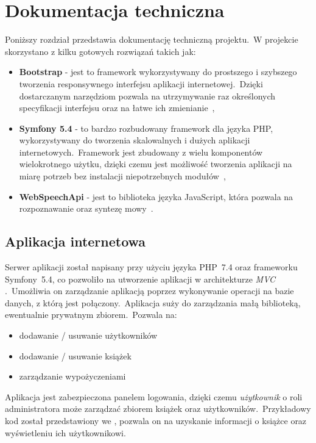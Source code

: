 \chapter{Dokumentacja techniczna}
Poniższy rozdział przedstawia dokumentację techniczną projektu.\ W projekcie skorzystano z kilku gotowych rozwiązań takich jak:
\begin{itemize}
    \item \textbf{Bootstrap} - jest to framework wykorzystywany do prostszego i szybszego tworzenia responsywnego interfejsu aplikacji internetowej.\ Dzięki dostarczanym narzędziom pozwala na utrzymywanie raz określonych specyfikacji interfejsu oraz na łatwe ich zmienianie~\cite{Bootstrap2023},
    \item \textbf{Symfony 5.4} - to bardzo rozbudowany framework dla języka PHP, wykorzystywany do tworzenia skalowalnych i dużych aplikacji internetowych.\ Framework jest zbudowany z wielu komponentów wielokrotnego użytku, dzięki czemu jest możliwość tworzenia aplikacji na miarę potrzeb bez instalacji niepotrzebnych modułów~\cite{Sym2023},
    \item \textbf{WebSpeechApi} - jest to biblioteka języka JavaScript, która pozwala na rozpoznawanie oraz syntezę mowy~\cite{WebSpeechApi}.
\end{itemize}

\section{Aplikacja internetowa}
Serwer aplikacji został napisany przy użyciu języka PHP~7.4 oraz frameworku Symfony~5.4, co pozwoliło na utworzenie aplikacji w architekturze \textit{MVC} .\ Umożliwia on zarządzanie aplikacją poprzez wykonywanie operacji na bazie danych, z którą jest połączony.\ Aplikacja suży do zarządzania małą biblioteką, ewentualnie prywatnym zbiorem.\ Pozwala na:

\begin{itemize}
    \item dodawanie / usuwanie użytkowników
    \item dodawanie / usuwanie książek
    \item zarządzanie wypożyczeniami
\end{itemize}

Aplikacja jest zabezpieczona panelem logowania, dzięki czemu \textit{użytkownik} o roli administratora może zarządzać zbiorem książek oraz użytkowników.\ Przykładowy kod został przedstawiony we , pozwala on na uzyskanie informacji o książce oraz wyświetleniu ich użytkownikowi.
\pagebreak


